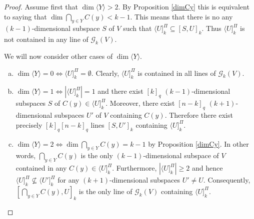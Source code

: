 \documentclass[12pt]{article}
\theoremstyle{definition}
\begin{document}
  \begin{proof}
    Assume first that $\dim \langle Y\rangle>2$. By Proposition \ref{dimCy} this is equivalent to saying that $\dim \bigcap_{y\in Y}C(y)<k-1$. This means that there is no any $(k-1)$-dimensional subspace $S$ of $V$ such that  $\langle U]^{\Pi}_{k}\subseteq [S, U]_k$. Thus $\langle U]^{\Pi}_{k}$ is not contained in any line of  ${\mathcal G}_{k}(V)$.

    \noindent
    We will now consider other cases of $\dim \langle Y\rangle$.
    \begin{enumerate}[a)]
    \item $\dim \langle Y\rangle=0\Leftrightarrow\langle U]^{\Pi}_{k}=\emptyset$. Clearly, $\langle U]^{\Pi}_{k}$ is contained in
   all lines of ${\mathcal G}_{k}(V)$.
    \item $\dim \langle Y\rangle=1\Leftrightarrow|\langle U]^{\Pi}_{k}|=1$ and there exist $[k]_q$ $(k-1)$-dimensional subspaces $S$ of $C(y)\in \langle U]^{\Pi}_{k}$. Moreover, there exist $[n-k]_q$ $(k+1)$-dimensional subspaces $U'$ of $V$ containing $C(y)$. Therefore there exist precisely $[k]_q[n-k]_q$ lines $[S, U']_k$ containing $\langle U]^{\Pi}_{k}$.
    \item $\dim \langle Y\rangle=2\Leftrightarrow\dim \bigcap_{y\in Y}C(y)=k-1$ by Proposition \ref{dimCy}. In other words,  $\bigcap_{y\in Y}C(y)$ is the only $(k-1)$-dimensional subspace of $V$ contained in any  $C(y)\in \langle U]^{\Pi}_{k}$. Furthermore, $|\langle U]^{\Pi}_{k}|\geqslant2$ and hence $\langle U]^{\Pi}_{k}\nsubseteq\langle U']^{\Pi}_{k}$ for any $(k+1)$-dimensional subspaces $U'\neq U$. Consequently, $[\bigcap_{y\in Y}C(y), U]_k$ is the only line of ${\mathcal G}_{k}(V)$ containing $\langle U]^{\Pi}_{k}$.
  \end{enumerate}
  \end{proof}
\end{document}
